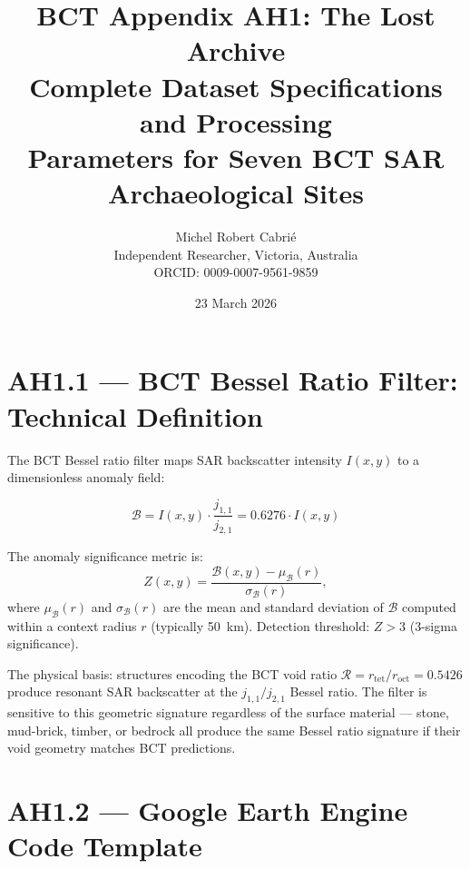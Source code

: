 \documentclass[12pt,twocolumn]{article}
\title{\textbf{\color{bctnavy}BCT Appendix AH1: The Lost Archive}\\
{\large\color{bctblue}Complete Dataset Specifications and Processing\\
Parameters for Seven BCT SAR Archaeological Sites}}
\author{Michel Robert Cabri\'{e}\\
{\small Independent Researcher, Victoria, Australia}\\
{\small ORCID: 0009-0007-9561-9859}}
\date{23 March 2026}
\begin{document}
\sloppy
{}

\section{AH1.1 --- BCT Bessel Ratio Filter: Technical Definition}

The BCT Bessel ratio filter maps SAR backscatter intensity
$I(x,y)$ to a dimensionless anomaly field:

\begin{equation}
\mathcal{B} = I(x,y)\cdot\frac{j_{1,1}}{j_{2,1}}
= 0.6276\cdot I(x,y)
\end{equation}

The anomaly significance metric is:
\begin{equation}
Z(x,y) = \frac{\mathcal{B}(x,y) - \mu_\mathcal{B}(r)}
{\sigma_\mathcal{B}(r)},
\end{equation}
where $\mu_\mathcal{B}(r)$ and $\sigma_\mathcal{B}(r)$ are
the mean and standard deviation of $\mathcal{B}$ computed
within a context radius $r$ (typically 50~km). Detection
threshold: $Z > 3$ (3-sigma significance).

The physical basis: structures encoding the BCT void ratio
$\mathcal{R} = r_\mathrm{tet}/r_\mathrm{oct} = 0.5426$
produce resonant SAR backscatter at the $j_{1,1}/j_{2,1}$
Bessel ratio. The filter is sensitive to this geometric
signature regardless of the surface material --- stone,
mud-brick, timber, or bedrock all produce the same
Bessel ratio signature if their void geometry matches
BCT predictions.

\section{AH1.2 --- Google Earth Engine Code Template}
\end{document}
